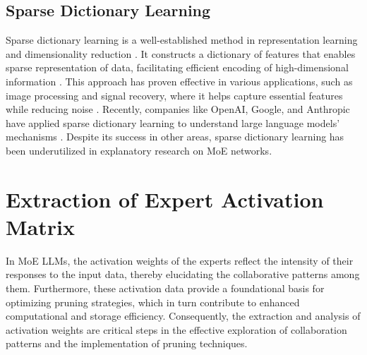 \documentclass[11pt]{article}
\begin{document}




\subsection{Sparse Dictionary Learning}
Sparse dictionary learning is a well-established method in representation learning and dimensionality reduction \cite{yang_image_2010, wright_robust_2009}. It constructs a dictionary of features that enables sparse representation of data, facilitating efficient encoding of high-dimensional information \cite{tang_explainable_2023, chen_pathlet_2013}. This approach has proven effective in various applications, such as image processing and signal recovery, where it helps capture essential features while reducing noise \cite{hou_detecting_2021, hou_visual_2020}. Recently, companies like OpenAI, Google, and Anthropic have applied sparse dictionary learning to understand large language models' mechanisms \cite{rajamanoharan_improving_2024, gao_scaling_nodate}. Despite its success in other areas, sparse dictionary learning has been underutilized in explanatory research on MoE networks.


\section{Extraction of Expert Activation Matrix} 
In MoE LLMs, the activation weights of the experts reflect the intensity of their responses to the input data, thereby elucidating the collaborative patterns among them. Furthermore, these activation data provide a foundational basis for optimizing pruning strategies, which in turn contribute to enhanced computational and storage efficiency. Consequently, the extraction and analysis of activation weights are critical steps in the effective exploration of collaboration patterns and the implementation of pruning techniques.
\end{document}
